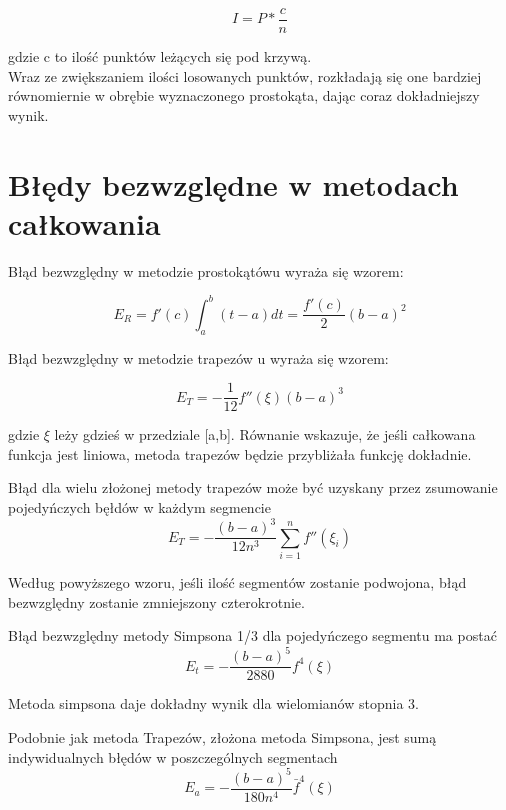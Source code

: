 \documentclass[12pt,twoside]{article}
\begin{document}
\begin{equation}
I = P * \frac{c}{n}
\end{equation}

gdzie c to ilość punktów leżących się pod krzywą.\\

Wraz ze zwiększaniem ilości losowanych punktów, rozkładają się one bardziej równomiernie w obrębie wyznaczonego prostokąta, dając coraz dokładniejszy wynik.\cite{MonteCarlo_2}


\section{Błędy bezwzględne w metodach całkowania}

Błąd bezwzględny w metodzie prostokątówu wyraża się wzorem:

\begin{equation}
E_R = f'(c)\int_a^b(t-a)dt = \frac{f'(c)}{2}(b-a)^2
\label{Eq:rectError}
\end{equation}

Błąd bezwzględny w metodzie trapezów u wyraża się wzorem:

\begin{equation}
E_T = -\frac{1}{12}f''(\xi)(b-a)^3
\label{Eq:rownanie}
\end{equation}

gdzie $\xi$ leży gdzieś w przedziale [a,b]. Równanie wskazuje, że jeśli całkowana funkcja jest liniowa, metoda trapezów będzie przybliżała funkcję dokładnie.

Błąd dla wielu złożonej metody trapezów może być uzyskany przez zsumowanie pojedyńczych bęłdów w każdym segmencie
\begin{equation}
E_T = -\frac{(b-a)^3}{12n^3}\sum_{i=1}^n f''(\xi_i)
\label{Eq:rownanie}
\end{equation}

Według powyższego wzoru, jeśli ilość segmentów zostanie podwojona, błąd bezwzględny zostanie zmniejszony czterokrotnie.

Błąd bezwzględny metody Simpsona 1/3 dla pojedyńczego segmentu ma postać
\begin{equation}
E_t = -\frac{(b-a)^5}{2880}f^{4}(\xi)
\label{Eq:rownanie}
\end{equation}

Metoda simpsona daje dokładny wynik dla wielomianów stopnia 3.

Podobnie jak metoda Trapezów,  złożona metoda Simpsona, jest sumą indywidualnych błędów w poszczególnych segmentach
\begin{equation}
E_a = -\frac{(b-a)^5}{180n^4}\bar{f}^{4}(\xi)
\label{Eq:rownanie}
\end{equation}
\end{document}
